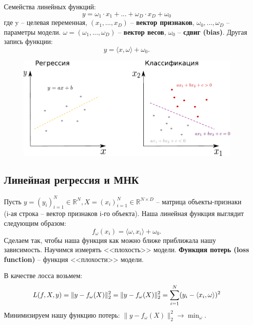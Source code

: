 \documentclass[a4paper, 10pt, openany]{book} %
\begin{document}
	Семейства линейных функций:
	\begin{equation*}
		y = \omega_1 \cdot x_1 + ... + \omega_D \cdot x_D + \omega_0
	\end{equation*}
	где y -- целевая переменная, $(x_1, ..., x_D)$ -- \textbf{вектор признаков}, $\omega_0, ..., \omega_D$ -- параметры модели. $\omega = (\omega_1, ..., \omega_D)$ -- \textbf{вектор весов}, $\omega_0$ -- \textbf{сдвиг (bias)}. Другая запись функции:
	\begin{equation*}
		y = \langle x,\omega \rangle + \omega_0.
	\end{equation*}
	\begin{figure}[h!]
		\centering
		\includegraphics[width=\linewidth]{pictures/linear_models/Class_models.pdf}
	\end{figure}
	
	\subsection{Линейная регрессия и МНК}
	
	Пусть $y = (y_i)_{i=1}^N  \in \mathbb{R}^N, X = (x_i)_{i=1}^N \in \mathbb{R}^{N \times D}$ -- матрица объекты-признаки (i-ая строка -- вектор признаков i-го объекта). Наша линейная функция выглядит следующим образом:
	\begin{equation*}
		f_\omega(x_i) = \langle \omega, x_i \rangle + \omega_0.
	\end{equation*}
	Сделаем так, чтобы наша функция как можно ближе приближала нашу зависимость. Научимся измерять <<плохость>> модели. \textbf{Функция потерь (loss function)} -- функция <<плохости>> модели.
	
	В качестве лосса возьмем: 
	\begin{equation*}
		L(f,X,y) = \|y - f_\omega(X)\|_2^2 = \\
		\|y - f_\omega(X)\|_2^2 = \sum_{i=1}^{N}(y_i - \langle x_i, \omega \rangle)^2
	\end{equation*}
	Минимизируем нашу функцию потерь: $\|y - f_\omega(X)\|_2^2 \rightarrow \mathop{min}_{\omega}$.
	
\end{document}
